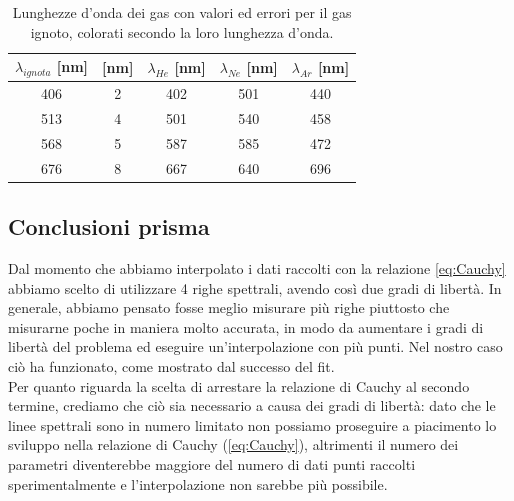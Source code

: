 \documentclass[letterpaper,12pt]{article}
\begin{document}
\begin{table}[h!]
    \centering
    \begin{tabular}{|c|c|c|c|c|}
    \hline
    \textbf{$\lambda_{ignota}$} [nm] & \text{$\pm\sigma_\text{ignoto}$} [nm] & \textbf{$\lambda_{He}$} [nm] & \textbf{$\lambda_{Ne}$} [nm] & \textbf{$\lambda_{Ar}$} [nm]\\
    \hline
    \cellcolor{wavelength_406} 406 & \cellcolor{wavelength_nan}2 & \cellcolor{wavelength_402} 402 & \cellcolor{wavelength_501} 501 & \cellcolor{wavelength_440} 440 \\
    \hline
    \cellcolor{wavelength_513} 513 & \cellcolor{wavelength_nan}4 & \cellcolor{wavelength_501} 501 & \cellcolor{wavelength_540} 540 & \cellcolor{wavelength_458} 458 \\
    \hline
    \cellcolor{wavelength_568} 568 & \cellcolor{wavelength_nan}5 & \cellcolor{wavelength_587} 587 & \cellcolor{wavelength_585} 585 & \cellcolor{wavelength_472} 472 \\
    \hline
    \cellcolor{wavelength_676} 676 & \cellcolor{wavelength_nan}8 & \cellcolor{wavelength_667} 667 & \cellcolor{wavelength_640} 640 & \cellcolor{wavelength_696} 696 \\
    \hline
    \end{tabular}
    \caption{Lunghezze d'onda dei gas con valori ed errori per il gas ignoto, colorati secondo la loro lunghezza d'onda.}
    \label{tab:prisma_ignoto}
\end{table}

\subsection{Conclusioni prisma}
Dal momento che abbiamo interpolato i dati raccolti con la relazione \ref{eq:Cauchy} abbiamo scelto di utilizzare 
4 righe spettrali, avendo così due gradi di libertà. In generale, abbiamo pensato fosse meglio misurare più righe 
piuttosto che misurarne poche in maniera molto accurata, in modo da aumentare i gradi di libertà del problema ed 
eseguire un'interpolazione con più punti. Nel nostro caso ciò ha funzionato, come mostrato dal successo del fit.\\
Per quanto riguarda la scelta di arrestare la relazione di Cauchy al secondo termine, crediamo che ciò sia necessario
a causa dei gradi di libertà: dato che le linee spettrali sono in numero limitato non possiamo proseguire a piacimento
lo sviluppo nella relazione di Cauchy (\ref{eq:Cauchy}), altrimenti il numero dei parametri diventerebbe maggiore
del numero di dati punti raccolti sperimentalmente e l'interpolazione non sarebbe più possibile.
\end{document}
